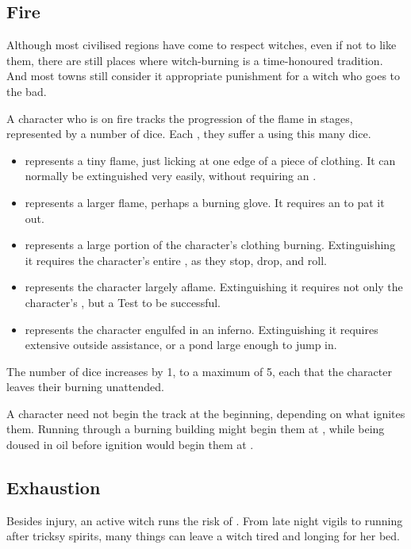 \subsection{Fire}

Although most civilised regions have come to respect witches, even if not to like them, there are still places where witch-burning is a time-honoured tradition.
And most towns still consider it appropriate punishment for a witch who goes to the bad.

A character who is on fire tracks the progression of the flame in stages, represented by a number of dice.
Each {\round}, they suffer a {\damagetest} using this many dice.
\begin{itemize}
	\item {} represents a tiny flame, just licking at one edge of a piece of clothing.
		It can normally be extinguished very easily, without requiring an {\action}.
	\item {} represents a larger flame, perhaps a burning glove.
		It requires an {\action} to pat it out.
	\item {} represents a large portion of the character's clothing burning.
		Extinguishing it requires the character's entire {\turn}, as they stop, drop, and roll.
	\item {} represents the character largely aflame.
		Extinguishing it requires not only the character's {\turn}, but a Test to be successful.
	\item {} represents the character engulfed in an inferno.
		Extinguishing it requires extensive outside assistance, or a pond large enough to jump in.
\end{itemize}
The number of dice increases by 1, to a maximum of 5, each {\turn} that the character leaves their burning unattended.

A character need not begin the track at the beginning, depending on what ignites them.
Running through a burning building might begin them at , while being doused in oil before ignition would begin them at .

\subsection{Exhaustion}

Besides injury, an active witch runs the risk of {\exhaustion}.
From late night vigils to running after tricksy spirits, many things can leave a witch tired and longing for her bed.


